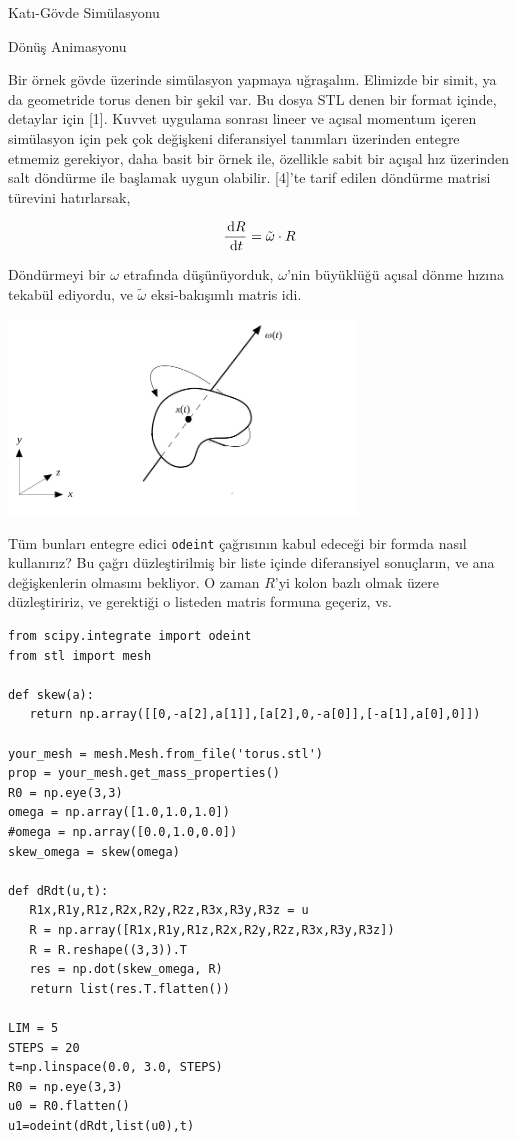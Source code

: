 \documentclass[12pt,fleqn]{article}\usepackage{../../common}
\begin{document}
Katı-Gövde Simülasyonu

Dönüş Animasyonu

Bir örnek gövde üzerinde simülasyon yapmaya uğraşalım. Elimizde bir simit, ya da
geometride torus denen bir şekil var. Bu dosya STL denen bir format içinde,
detaylar için [1]. Kuvvet uygulama sonrası lineer ve açısal momentum içeren
simülasyon için pek çok değişkeni diferansiyel tanımları üzerinden entegre
etmemiz gerekiyor, daha basit bir örnek ile, özellikle sabit bir açışal hız
üzerinden salt döndürme ile başlamak uygun olabilir. [4]'te tarif edilen
döndürme matrisi türevini hatırlarsak,

$$
\frac{\,\mathrm{d} R}{\,\mathrm{d} t} = \tilde \omega \cdot R
$$

Döndürmeyi bir $\omega$ etrafında düşünüyorduk, $\omega$'nin büyüklüğü
açısal dönme hızına tekabül ediyordu, ve $\tilde \omega$ eksi-bakışımlı
matris idi.

\includegraphics[width=25em]{phy_005_basics_04_01.png}

Tüm bunları entegre edici \verb!odeint! çağrısının kabul edeceği bir formda
nasıl kullanırız? Bu çağrı düzleştirilmiş bir liste içinde diferansiyel
sonuçların, ve ana değişkenlerin olmasını bekliyor. O zaman $R$'yi kolon bazlı
olmak üzere düzleştiririz, ve gerektiği o listeden matris formuna geçeriz, vs.

\begin{verbatim}
from scipy.integrate import odeint
from stl import mesh

def skew(a):
   return np.array([[0,-a[2],a[1]],[a[2],0,-a[0]],[-a[1],a[0],0]])

your_mesh = mesh.Mesh.from_file('torus.stl')
prop = your_mesh.get_mass_properties()
R0 = np.eye(3,3)
omega = np.array([1.0,1.0,1.0])
#omega = np.array([0.0,1.0,0.0])
skew_omega = skew(omega)
   
def dRdt(u,t):   
   R1x,R1y,R1z,R2x,R2y,R2z,R3x,R3y,R3z = u
   R = np.array([R1x,R1y,R1z,R2x,R2y,R2z,R3x,R3y,R3z])
   R = R.reshape((3,3)).T
   res = np.dot(skew_omega, R)
   return list(res.T.flatten())

LIM = 5
STEPS = 20
t=np.linspace(0.0, 3.0, STEPS)
R0 = np.eye(3,3)
u0 = R0.flatten()
u1=odeint(dRdt,list(u0),t)
\end{verbatim}
\end{document}
